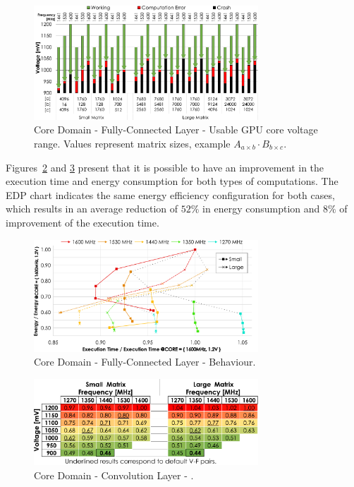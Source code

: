 \begin{figure}[htbp]
    \centering
        \includegraphics[width=0.75\textwidth]{Figures/Application To Deep Learning/MatrixMul_guardband.pdf}
        \caption{Core Domain - Fully-Connected Layer - Usable GPU core voltage range. Values represent matrix sizes, example $A_{a \times b} \cdot B_{b \times c}$.}
    \label{fig:MatrixMult_guardband}
\end{figure}


Figures~\ref{fig:MatrixMult_behaviour} and \ref{fig:MatrixMult_EDP} present that it is possible to have an improvement in the execution time and energy consumption for both types of computations. The EDP chart indicates the same energy efficiency configuration for both cases, which results in an average reduction of $52\%$ in energy consumption and $8\%$ of improvement of the execution time.


\begin{figure}[htbp]
    \centering
        \includegraphics[width=0.75\textwidth]{Figures/Application To Deep Learning/MatrixMul_behaviour.pdf}
        \caption{Core Domain - Fully-Connected Layer - Behaviour.}
    \label{fig:MatrixMult_behaviour}
\end{figure}





\begin{figure}[htbp]
    \centering
        \includegraphics[width=0.75\textwidth]{Figures/Application To Deep Learning/MatrixMul_EDP.pdf}
        \caption{Core Domain - Convolution Layer - .}
    \label{fig:MatrixMult_EDP}
\end{figure}

